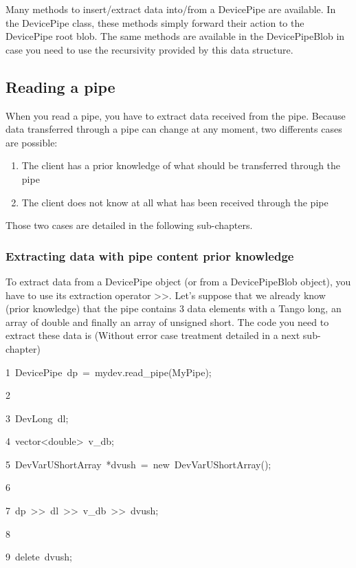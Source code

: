 Many methods to insert/extract data into/from a DevicePipe are available.
In the DevicePipe class, these methods simply forward their action
to the DevicePipe root blob. The same methods are available in the
DevicePipeBlob in case you need to use the recursivity provided by
this data structure.


\subsection{Reading a pipe}

When you read a pipe, you have to extract data received from the pipe.
Because data transferred through a pipe can change at any moment,
two differents cases are possible:
\begin{enumerate}
\item The client has a prior knowledge of what should be transferred through
the pipe
\item The client does not know at all what has been received through the
pipe
\end{enumerate}
Those two cases are detailed in the following sub-chapters.


\subsubsection{Extracting data with pipe content prior knowledge}

To extract data from a DevicePipe object (or from a DevicePipeBlob
object), you have to use its extraction operator \textquotedbl{}>\textcompwordmark{}>\textquotedbl{}.
Let's suppose that we already know (prior knowledge) that the pipe
contains 3 data elements with a Tango long, an array of double and
finally an array of unsigned short. The code you need to extract these
data is (Without error case treatment detailed in a next sub-chapter)


\begin{lyxcode}
1~DevicePipe~dp~=~mydev.read\_pipe(\textquotedbl{}MyPipe\textquotedbl{});

2~

3~DevLong~dl;~~

4~vector<double>~v\_db;~~

5~DevVarUShortArray~{*}dvush~=~new~DevVarUShortArray();

6~

7~dp~>\textcompwordmark{}>~dl~>\textcompwordmark{}>~v\_db~>\textcompwordmark{}>~dvush;

8

9~delete~dvush;
\end{lyxcode}


